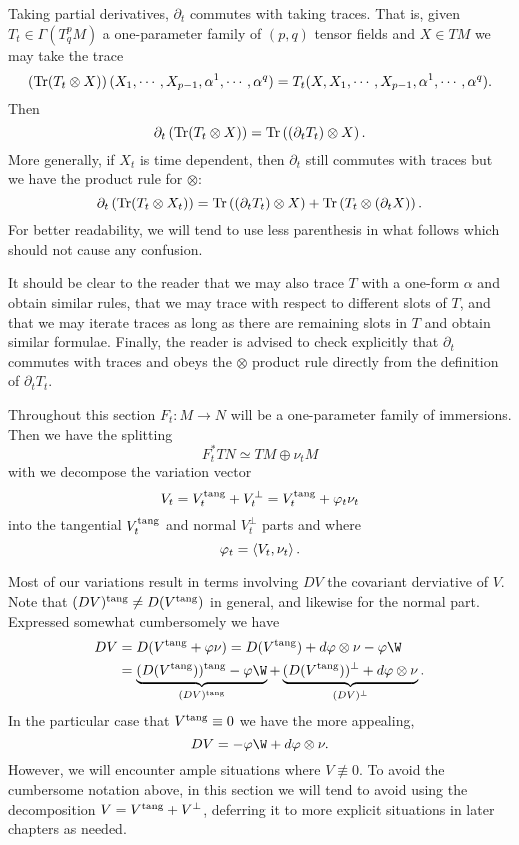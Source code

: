 \begin{rem}
Taking partial derivatives, \(\partial_t\) commutes with taking traces. That is, given \(T_t \in \Gamma(T^p_q M)\) a one-parameter family of \((p,q)\) tensor fields and \(X \in TM\) we may take the trace
\[
\left(\operatorname{Tr} (T_t \otimes X)\right) (X_1, \cdots, X_{p-1}, \alpha^1, \cdots, \alpha^q) = T_t(X, X_1, \cdots, X_{p-1}, \alpha^1, \cdots, \alpha^q).
\]
Then
\[
\partial_t \left(\operatorname{Tr} (T_t \otimes X)\right) = \operatorname{Tr} \left((\partial_t T_t) \otimes X\right).
\]
More generally, if \(X_t\) is time dependent, then \(\partial_t\) still commutes with traces but we have the product rule for \(\otimes\):
\[
\partial_t \left(\operatorname{Tr} (T_t \otimes X_t)\right) = \operatorname{Tr} \left((\partial_t T_t) \otimes X\right) + \operatorname{Tr} \left(T_t \otimes (\partial_t X)\right).
\]
For better readability, we will tend to use less parenthesis in what follows which should not cause any confusion.

It should be clear to the reader that we may also trace \(T\) with a one-form \(\alpha\) and obtain similar rules, that we may trace with respect to different slots of \(T\), and that we may iterate traces as long as there are remaining slots in \(T\) and obtain similar formulae. Finally, the reader is advised to check explicitly that \(\partial_t\) commutes with traces and obeys the \(\otimes\) product rule directly from the definition of \(\partial_t T_t\).
\end{rem}

Throughout this section \(F_t : M \to N\) will be a one-parameter family of immersions. Then we have the splitting
\[
F_t^{\ast} TN \simeq TM \oplus \nu_t M
\]
with we decompose the variation vector
\[
V_t = V^{\operatorname{tang}}_t + V^{\perp}_t = V^{\operatorname{tang}}_t + \varphi_t \nu_t
\]
into the tangential \(V^{\operatorname{tang}}_t\) and normal \(V^{\perp}_t\) parts and where
\[
\varphi_t = \left\langle V_t,\nu_t \right\rangle.
\]

\begin{rem}
Most of our variations result in terms involving \(DV\) the covariant derviative of \(V\). Note that \((DV)^{\operatorname{tang}} \ne D(V^{\operatorname{tang}})\) in general, and likewise for the normal part. Expressed somewhat cumbersomely we have
\[
\begin{split}
DV &= D(V^{\tang} + \varphi \nu) = D(V^{\tang}) + d\varphi \otimes \nu - \varphi\W \\
&= \underbrace{(D(V^{\tang}))^{\tang} - \varphi\W}_{(DV)^{\tang}} + \underbrace{(D(V^{\tang}))^{\perp} + d\varphi \otimes \nu}_{(DV)^{\perp}}.
\end{split}
\]
In the particular case that \(V^{\operatorname{tang}} \equiv 0\) we have the more appealing,
\[
DV = -\varphi\W + d\varphi \otimes \nu.
\]
However, we will encounter ample situations where \(V \not\equiv 0\). To avoid the cumbersome notation above, in this section we will tend to avoid using the decomposition \(V = V^{\operatorname{tang}} + V^{\perp}\), deferring it to more explicit situations in later chapters as needed.
\end{rem}

